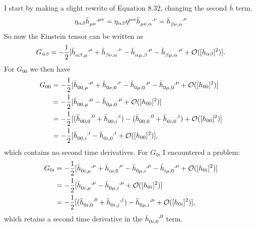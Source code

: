 \documentclass[gr-notes.tex]{subfiles}
\begin{document}
I start by making a slight rewrite of Equation 8.32, changing the second $\bar{h}$ term.
%
\begin{displaymath}
  \eta_{\alpha\beta} \tensor{\bar{h}}{_{\mu\nu}^{,\mu\nu}} =
  \eta_{\alpha\beta} \eta^{\mu\alpha} \tensor{\bar{h}}{_{\mu\nu,\alpha}^{,\nu}} =
  \tensor{\bar{h}}{_{\beta\nu,\alpha}^{,\nu}}
\end{displaymath}
%
So now the Einstein tensor can be written as
%
\begin{displaymath}
  G_{\alpha\beta} =
 -\frac{1}{2} [
    \tensor{\bar{h}}{_{\alpha\beta,\mu}^{,\mu}} +
    \tensor{\bar{h}}{_{\beta\nu,\alpha}^{,\nu}} -
    \tensor{\bar{h}}{_{\alpha\mu,\beta}^{,\mu}} -
    \tensor{\bar{h}}{_{\beta\mu,\alpha}^{,\mu}} +
    \order*{[h_{\alpha\beta}]^2}
  ].
\end{displaymath}
%
For $G_{00}$ we then have
%
\begin{align*}
  G_{00} &=
 -\frac{1}{2} [
    \tensor{\bar{h}}{_{00,\mu}^{,\mu}} +
    \tensor{\bar{h}}{_{0\nu,0}^{,\nu}} -
    \tensor{\bar{h}}{_{0\mu,0}^{,\mu}} -
    \tensor{\bar{h}}{_{0\mu,0}^{,\mu}} +
    \order*{[h_{00}]^2}
  ]
  \\ &=
 -\frac{1}{2} [
    \tensor{\bar{h}}{_{00,\mu}^{,\mu}} -
    \tensor{\bar{h}}{_{0\mu,0}^{,\mu}} +
    \order*{[h_{00}]^2}
  ]
  \\ &=
 -\frac{1}{2} [
    (\tensor{\bar{h}}{_{00,0}^{,0}} + \tensor{\bar{h}}{_{00,i}^{,i}}) -
    (\tensor{\bar{h}}{_{00,0}^{,0}} + \tensor{\bar{h}}{_{0i,0}^{,i}}) +
    \order*{[h_{00}]^2}
  ]
  \\ &=
 -\frac{1}{2} [
    \tensor{\bar{h}}{_{00,i}^{,i}} -
    \tensor{\bar{h}}{_{0i,0}^{,i}} +
    \order*{[h_{00}]^2}
  ],
\end{align*}
%
which contains no second time derivatives. For $G_{0i}$ I encountered a problem:
%
\begin{align*}
  G_{0i} &=
 -\frac{1}{2} [
    \tensor{\bar{h}}{_{0i,\mu}^{,\mu}} +
    \tensor{\bar{h}}{_{i\nu,0}^{,\nu}} -
    \tensor{\bar{h}}{_{0\mu,i}^{,\mu}} -
    \tensor{\bar{h}}{_{i\mu,0}^{,\mu}} +
    \order*{[h_{0i}]^2}
  ]
  \\ &=
 -\frac{1}{2} [
    \tensor{\bar{h}}{_{0i,\mu}^{,\mu}} -
    \tensor{\bar{h}}{_{0\mu,i}^{,\mu}} +
    \order*{[h_{0i}]^2}
  ]
  \\ &=
 -\frac{1}{2} [
    (\tensor{\bar{h}}{_{0i,0}^{,0}} + \tensor{\bar{h}}{_{0i,j}^{,j}}) -
    \tensor{\bar{h}}{_{0\mu,i}^{,\mu}} +
    \order*{[h_{0i}]^2}
  ],
\end{align*}
%
which retains a second time derivative in the $\tensor{\bar{h}}{_{0i,0}^{,0}}$ term.
\end{document}
